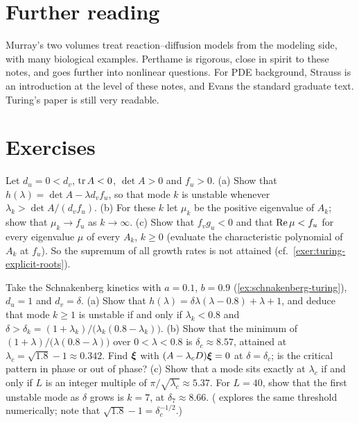 \section{Further reading}\label{sec:outlook-reading}

Murray's two volumes \cite{Murray2002,Murray2003} treat reaction--diffusion models
from the modeling side, with many biological examples. Perthame \cite{Perthame2015}
is rigorous, close in spirit to these notes, and goes further into nonlinear
questions. For PDE background, Strauss \cite{Strauss2008} is an introduction at the
level of these notes, and Evans \cite{Evans2010} the standard graduate text.
Turing's paper \cite{Turing1952} is still very readable.

\section{Exercises}\label{sec:outlook-exercises}

\begin{exercise}[$\ast$]\label{exer:outlook-rdode}
Let $d_u=0<d_v$, $\operatorname{tr} A<0$, $\det A>0$ and $f_u>0$. (a) Show that
$h(\lambda)=\det A-\lambda d_vf_u$, so that mode $k$ is unstable whenever
$\lambda_k>\det A/(d_vf_u)$. (b) For these $k$ let $\mu_k$ be the positive eigenvalue
of $A_k$; show that $\mu_k\to f_u$ as $k\to\infty$. (c) Show that $f_vg_u<0$ and
that $\operatorname{Re}\mu<f_u$ for every eigenvalue $\mu$ of every $A_k$, $k\ge0$ (evaluate the
characteristic polynomial of $A_k$ at $f_u$). So the supremum of all growth rates is
not attained (cf.\ \cref{exer:turing-explicit-roots}).
\end{exercise}

\begin{exercise}\label{exer:outlook-threshold}
Take the Schnakenberg kinetics with $a=0.1$, $b=0.9$
(\cref{ex:schnakenberg-turing}), $d_u=1$ and $d_v=\delta$. (a) Show that
$h(\lambda)=\delta\lambda(\lambda-0.8)+\lambda+1$, and deduce that mode $k\ge1$ is
unstable if and only if $\lambda_k<0.8$ and
$\delta>\delta_k=(1+\lambda_k)/\big(\lambda_k(0.8-\lambda_k)\big)$. (b) Show that
the minimum of $(1+\lambda)/\big(\lambda(0.8-\lambda)\big)$ over $0<\lambda<0.8$ is
$\delta_c\approx8.57$, attained at $\lambda_c=\sqrt{1.8}-1\approx0.342$. Find $\boldsymbol{\xi}$
with $(A-\lambda_cD)\boldsymbol{\xi}=0$ at $\delta=\delta_c$; is the critical pattern in phase
or out of phase? (c) Show that a mode sits exactly at $\lambda_c$ if and only if $L$
is an integer multiple of $\pi/\sqrt{\lambda_c}\approx5.37$. For $L=40$, show that
the first unstable mode as $\delta$ grows is $k=7$, at $\delta_7\approx8.66$.
( explores the same threshold numerically; note
that $\sqrt{1.8}-1=\delta_c^{-1/2}$.)
\end{exercise}

